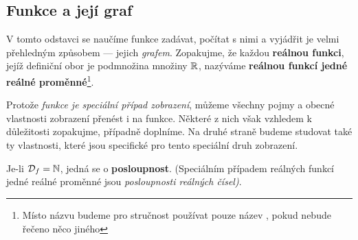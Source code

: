     \subsection{Funkce a její graf}\label{MAI:section_002}
      V tomto odstavci se naučíme funkce zadávat, počítat s nimi a vyjádřit je velmi přehledným 
      způsobem — jejich \emph{grafem}. Zopakujme, že každou \textbf{reálnou funkci}, jejíž 
      definiční obor je podmnožina množiny \(\mathbb{R}\), nazýváme \textbf{reálnou funkcí jedné 
      reálné proměnné}\footnote{Místo názvu  budeme pro 
      stručnost používat pouze název , pokud nebude řečeno něco jiného}.
      
      Protože \emph{funkce je speciální případ zobrazení}, můžeme všech\-ny pojmy a obecné 
      vlastnosti zobrazení přenést i na funkce. Některé z nich však vzhledem k důležitosti 
      zopakujme, případně doplníme. Na druhé straně budeme studovat také ty vlastnosti, které jsou 
      specifické pro tento speciální druh zobrazení.
      
      \begin{note}
        Je-li \(\mathcal{D}_f = \mathbb{N}\), jedná se o \textbf{posloupnost}. (Speciálním 
        případem reálných funkcí jedné reálné proměnné jsou \emph{posloupnosti reálných čísel)}.
      \end{note}
      
